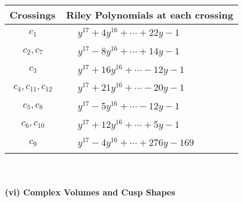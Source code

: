 \documentclass[1p]{elsarticle_modified}
\theoremstyle{definition}
\begin{document}
\begin{tabular}{m{50pt}|m{274pt}}
Crossings & \hspace{64pt}Riley Polynomials at each crossing \\
\hline $$\begin{aligned}c_{1}\end{aligned}$$&$\begin{aligned}
&y^{17}+4 y^{16}+\cdots+22 y-1
\end{aligned}$\\
\hline $$\begin{aligned}c_{2},c_{7}\end{aligned}$$&$\begin{aligned}
&y^{17}-8 y^{16}+\cdots+14 y-1
\end{aligned}$\\
\hline $$\begin{aligned}c_{3}\end{aligned}$$&$\begin{aligned}
&y^{17}+16 y^{16}+\cdots-12 y-1
\end{aligned}$\\
\hline $$\begin{aligned}c_{4},c_{11},c_{12}\end{aligned}$$&$\begin{aligned}
&y^{17}+21 y^{16}+\cdots-20 y-1
\end{aligned}$\\
\hline $$\begin{aligned}c_{5},c_{8}\end{aligned}$$&$\begin{aligned}
&y^{17}-5 y^{16}+\cdots-12 y-1
\end{aligned}$\\
\hline $$\begin{aligned}c_{6},c_{10}\end{aligned}$$&$\begin{aligned}
&y^{17}+12 y^{16}+\cdots+5 y-1
\end{aligned}$\\
\hline $$\begin{aligned}c_{9}\end{aligned}$$&$\begin{aligned}
&y^{17}-4 y^{16}+\cdots+276 y-169
\end{aligned}$\\
\hline
\end{tabular}\\~\\
\newpage\flushleft \textbf{(vi) Complex Volumes and Cusp Shapes}
\end{document}
